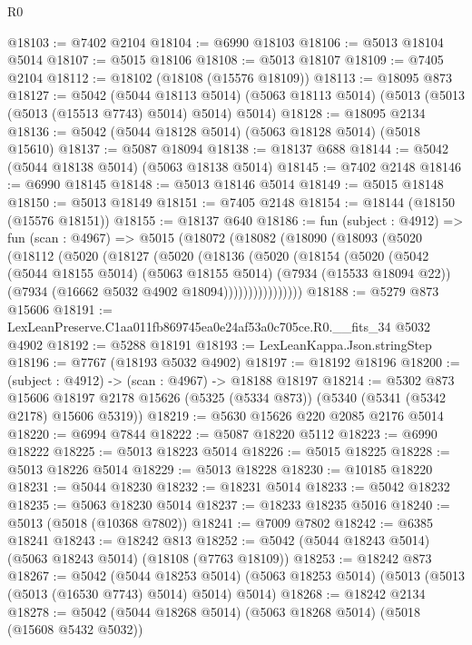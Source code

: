 \begin{lexlean}{R0}
\begin{coremodule}
@18103 := @7402 @2104
@18104 := @6990 @18103
@18106 := @5013 @18104 @5014
@18107 := @5015 @18106
@18108 := @5013 @18107
@18109 := @7405 @2104
@18112 := @18102 (@18108 (@15576 @18109))
@18113 := @18095 @873
@18127 := @5042
    (@5044 @18113 @5014)
    (@5063 @18113 @5014)
    (@5013 (@5013 (@5013 (@15513 @7743) @5014) @5014) @5014)
@18128 := @18095 @2134
@18136 := @5042 (@5044 @18128 @5014) (@5063 @18128 @5014) (@5018 @15610)
@18137 := @5087 @18094
@18138 := @18137 @688
@18144 := @5042 (@5044 @18138 @5014) (@5063 @18138 @5014)
@18145 := @7402 @2148
@18146 := @6990 @18145
@18148 := @5013 @18146 @5014
@18149 := @5015 @18148
@18150 := @5013 @18149
@18151 := @7405 @2148
@18154 := @18144 (@18150 (@15576 @18151))
@18155 := @18137 @640
@18186 := fun (subject : @4912) =>
  fun (scan : @4967) =>
  @5015
    (@18072
      (@18082
        (@18090
          (@18093
            (@5020
              (@18112
                (@5020
                  (@18127
                    (@5020
                      (@18136
                        (@5020
                          (@18154
                            (@5020
                              (@5042
                                (@5044 @18155 @5014)
                                (@5063 @18155 @5014)
                                (@7934 (@15533 @18094 @22))
                                (@7934 (@16662 @5032 @4902 @18094))))))))))))))))
@18188 := @5279 @873 @15606
@18191 := LexLeanPreserve.C1aa011fb869745ea0e24af53a0c705ce.R0.__fits_34 @5032 @4902
@18192 := @5288 @18191
@18193 := LexLeanKappa.Json.stringStep
@18196 := @7767 (@18193 @5032 @4902)
@18197 := @18192 @18196
@18200 := (subject : @4912) -> (scan : @4967) -> @18188 @18197
@18214 := @5302
    @873
    @15606
    @18197
    @2178
    @15626
    (@5325 (@5334 @873))
    (@5340 (@5341 (@5342 @2178) @15606 @5319))
@18219 := @5630 @15626 @220 @2085 @2176 @5014
@18220 := @6994 @7844
@18222 := @5087 @18220 @5112
@18223 := @6990 @18222
@18225 := @5013 @18223 @5014
@18226 := @5015 @18225
@18228 := @5013 @18226 @5014
@18229 := @5013 @18228
@18230 := @10185 @18220
@18231 := @5044 @18230
@18232 := @18231 @5014
@18233 := @5042 @18232
@18235 := @5063 @18230 @5014
@18237 := @18233 @18235 @5016
@18240 := @5013 (@5018 (@10368 @7802))
@18241 := @7009 @7802
@18242 := @6385 @18241
@18243 := @18242 @813
@18252 := @5042 (@5044 @18243 @5014) (@5063 @18243 @5014) (@18108 (@7763 @18109))
@18253 := @18242 @873
@18267 := @5042
    (@5044 @18253 @5014)
    (@5063 @18253 @5014)
    (@5013 (@5013 (@5013 (@16530 @7743) @5014) @5014) @5014)
@18268 := @18242 @2134
@18278 := @5042 (@5044 @18268 @5014) (@5063 @18268 @5014) (@5018 (@15608 @5432 @5032))

\end{coremodule}
\end{lexlean}
